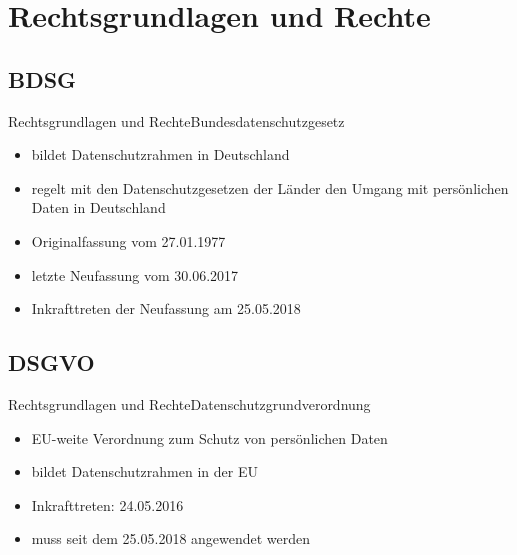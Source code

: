 \documentclass[9pt]{beamer}
\begin{document}
    \section{Rechtsgrundlagen und Rechte}
        \subsection{BDSG}
            \begin{frame}{Rechtsgrundlagen und Rechte}{Bundesdatenschutzgesetz}
                \begin{itemize}
                    \item bildet Datenschutzrahmen in Deutschland
            		\item regelt mit den Datenschutzgesetzen der Länder den Umgang mit persönlichen Daten in Deutschland
            		\item Originalfassung vom 27.01.1977
            		\item letzte Neufassung vom 30.06.2017
            		\item Inkrafttreten der Neufassung am 25.05.2018
            	\end{itemize}
            \end{frame}


        \subsection{DSGVO}
            \begin{frame}{Rechtsgrundlagen und Rechte}{Datenschutzgrundverordnung}
                \begin{itemize}
	                \item EU-weite Verordnung zum Schutz von persönlichen Daten
	                \item bildet Datenschutzrahmen in der EU
            		\item Inkrafttreten: 24.05.2016
            		\item muss seit dem 25.05.2018 angewendet werden
            	\end{itemize}
            \end{frame}
        
\end{document}
